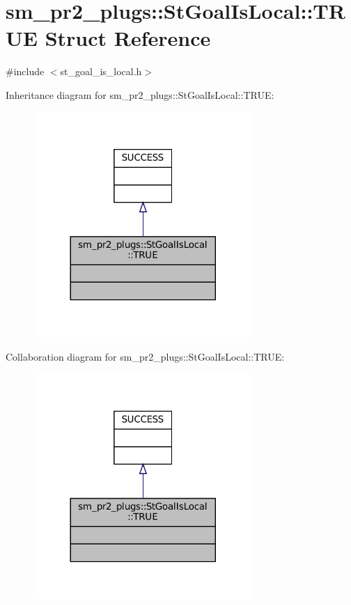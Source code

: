 \hypertarget{structsm__pr2__plugs_1_1StGoalIsLocal_1_1TRUE}{}\section{sm\+\_\+pr2\+\_\+plugs\+:\+:St\+Goal\+Is\+Local\+:\+:T\+R\+UE Struct Reference}
\label{structsm__pr2__plugs_1_1StGoalIsLocal_1_1TRUE}


{\ttfamily \#include $<$st\+\_\+goal\+\_\+is\+\_\+local.\+h$>$}



Inheritance diagram for sm\+\_\+pr2\+\_\+plugs\+:\+:St\+Goal\+Is\+Local\+:\+:T\+R\+UE\+:
\nopagebreak
\begin{figure}[H]
\begin{center}
\leavevmode
\includegraphics[width=236pt]{structsm__pr2__plugs_1_1StGoalIsLocal_1_1TRUE__inherit__graph}
\end{center}
\end{figure}


Collaboration diagram for sm\+\_\+pr2\+\_\+plugs\+:\+:St\+Goal\+Is\+Local\+:\+:T\+R\+UE\+:
\nopagebreak
\begin{figure}[H]
\begin{center}
\leavevmode
\includegraphics[width=236pt]{structsm__pr2__plugs_1_1StGoalIsLocal_1_1TRUE__coll__graph}
\end{center}
\end{figure}


